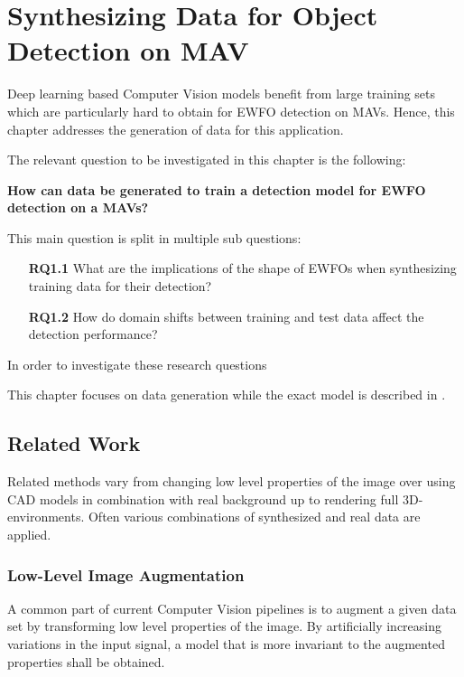 \chapter{Synthesizing Data for Object Detection on \ac{MAV}}
\label{sec:training}

Deep learning based Computer Vision models benefit from large training sets which are particularly hard to obtain for \ac{EWFO} detection on \acp{MAV}. Hence, this chapter addresses the generation of data for this application. 

The relevant question to be investigated in this chapter is the following:

\textbf{How can data be generated to train a detection model for \ac{EWFO} detection on a \acp{MAV}?} 

This main question is split in multiple sub questions:
\begin{enumerate}
	\item[\textbf{RQ1.1}] What are the implications of the shape of \acp{EWFO} when synthesizing training data for their detection?
	\item[\textbf{RQ1.2}] How do domain shifts between training and test data affect the detection performance?
\end{enumerate}

In order to investigate these research questions 

This chapter focuses on data generation while the exact model is described in .







\section{Related Work}
\label{sec:training:related}

Related methods vary from changing low level properties of the image over using CAD models in combination with real background up to rendering full 3D-environments. Often various combinations of synthesized and real data are applied. 

\subsection{Low-Level Image Augmentation}

A common part of current Computer Vision pipelines is to augment a given data set by transforming low level properties of the image. By artificially increasing variations in the input signal, a model that is more invariant to the augmented properties shall be obtained.

